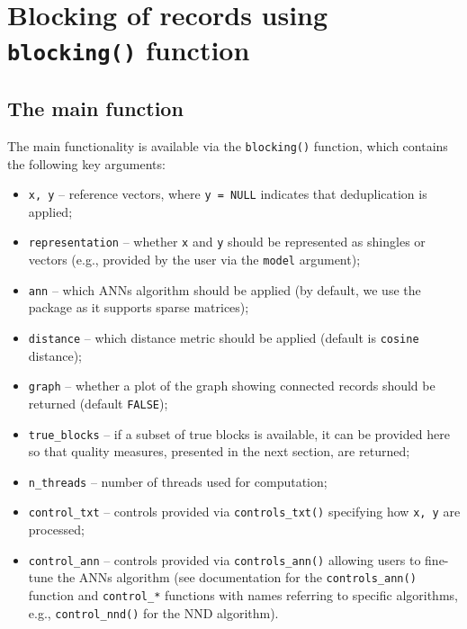\section{\texorpdfstring{Blocking of records using \texttt{blocking()} function}{Blocking of records using blocking() function}}\label{sec-blocks}

\subsection{The main function}\label{the-main-function}

The main functionality is available via the \texttt{blocking()} function, which
contains the following key arguments:

\begin{itemize}
\tightlist
\item
  \texttt{x,\ y} -- reference vectors, where \texttt{y\ =\ NULL} indicates that
  deduplication is applied;
\item
  \texttt{representation} -- whether \texttt{x} and \texttt{y} should be represented as
  shingles or vectors (e.g., provided by the user via the \texttt{model}
  argument);
\item
  \texttt{ann} -- which ANNs algorithm should be applied (by default, we use
  the  package as it supports sparse matrices);
\item
  \texttt{distance} -- which distance metric should be applied (default is
  \texttt{cosine} distance);
\item
  \texttt{graph} -- whether a plot of the graph showing connected records
  should be returned (default \texttt{FALSE});
\item
  \texttt{true\_blocks} -- if a subset of true blocks is available, it can be
  provided here so that quality measures, presented in the next
  section, are returned;
\item
  \texttt{n\_threads} -- number of threads used for computation;
\item
  \texttt{control\_txt} -- controls provided via \texttt{controls\_txt()} specifying
  how \texttt{x,\ y} are processed;
\item
  \texttt{control\_ann} -- controls provided via \texttt{controls\_ann()} allowing
  users to fine-tune the ANNs algorithm (see documentation for the
  \texttt{controls\_ann()} function and \texttt{control\_*} functions with names
  referring to specific algorithms, e.g., \texttt{control\_nnd()} for the NND
  algorithm).
\end{itemize}

